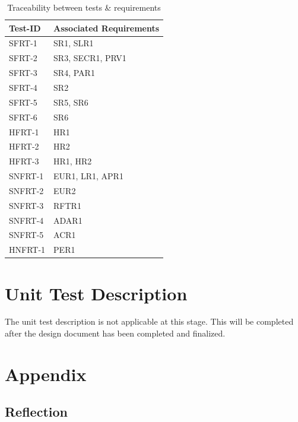 \documentclass[12pt, titlepage]{article}
\begin{document}
\begin{center}
\begin{table}[H]
    \centering
    \begin{tabular}{|p{2cm}|p{7cm}|}
    \hline
    \textbf{Test-ID} & \textbf{Associated Requirements}\\
    \hline
    SFRT-1 & SR1, SLR1\\
    \hline
    SFRT-2 & SR3, SECR1, PRV1\\
    \hline
    SFRT-3 & SR4, PAR1\\
    \hline
    SFRT-4 & SR2\\
    \hline
    SFRT-5 & SR5, SR6\\
    \hline
    SFRT-6 & SR6\\
    \hline
    HFRT-1 & HR1\\
    \hline
    HFRT-2 & HR2\\
    \hline
    HFRT-3 & HR1, HR2\\
    \hline
    SNFRT-1 & EUR1, LR1, APR1\\
    \hline
    SNFRT-2 & EUR2\\
    \hline
    SNFRT-3 & RFTR1\\
    \hline
    SNFRT-4 & ADAR1\\
    \hline
    SNFRT-5 & ACR1\\
    \hline
    HNFRT-1 & PER1\\
    \hline
    \end{tabular}
    \caption{Traceability between tests \& requirements}
    \label{tab:my_label}
\end{table}
\end{center}

\section{Unit Test Description}
The unit test description is not applicable at this stage. This will be completed after the design document has been completed and finalized.

\section{Appendix}

\subsection{Reflection}

\subsubsection{}
\end{document}
